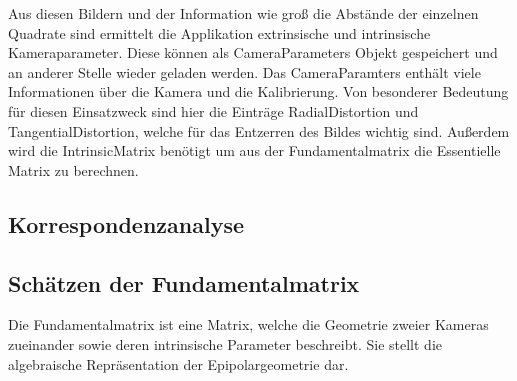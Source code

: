 Aus diesen Bildern und der Information wie groß die Abstände der einzelnen Quadrate sind ermittelt die Applikation extrinsische und intrinsische Kameraparameter. Diese können als CameraParameters Objekt gespeichert und an anderer Stelle wieder geladen werden. Das CameraParamters enthält viele Informationen über die Kamera und die Kalibrierung. Von besonderer Bedeutung für diesen Einsatzweck sind hier die Einträge RadialDistortion und TangentialDistortion, welche für das Entzerren des Bildes wichtig sind. Außerdem wird die IntrinsicMatrix benötigt um aus der Fundamentalmatrix die Essentielle Matrix zu berechnen. \cite{Mathworksa}

\subsection{Korrespondenzanalyse}
\label{sec:Korrespondenzanalyse}

\subsection{Schätzen der Fundamentalmatrix}
\label{sec:Schätzen der Fundamentalmatrix}
Die Fundamentalmatrix ist eine Matrix, welche die Geometrie zweier Kameras zueinander sowie deren intrinsische Parameter beschreibt. Sie stellt die algebraische Repräsentation der Epipolargeometrie dar.\cite{Richard2000}

